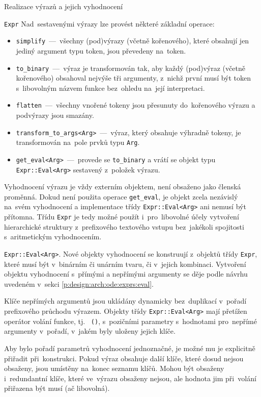\documentclass[thesis=M,czech]{FITthesis}[2012/06/26]
\newcommand{\id}[1]{\texttt{#1}}
\newcommand{\rf}[1]{\ref{#1}}
\begin{document}
\begin{section}{Realizace výrazů a jejich vyhodnocení}
\begin{paragraph}{\id{Expr}}
Nad~sestavenými výrazy lze provést některé základní operace:
\begin{itemize}
\item \id{simplify}~---~všechny (pod)výrazy (včetně kořenového),
   které obsahují jen jediný argument typu token,
   jsou převedeny na~token.
\item \id{to\_\-binary}~---~výraz je transformován tak,
   aby každý (pod)výraz (včetně kořenového)
   obsahoval nejvýše tři argumenty,
   z~nichž první musí být token s~libovolným názvem funkce
   bez~ohledu na~její interpretaci.
\item \id{flatten}~---~všechny vnořené tokeny jsou přesunuty
   do~kořenového výrazu a podvýrazy jsou smazány.
\item \id{transform\_\-to\_\-args<Arg>}~---~výraz,
   který obsahuje výhradně tokeny,
   je transformován na~pole prvků typu \id{Arg}.
\item \id{get\_\-eval<Arg>}~---~provede se \id{to\_\-binary}
   a vrátí se objekt typu \id{Expr::\-Eval<Arg>}
   sestavený z~položek výrazu.
\end{itemize}

Vyhodnocení výrazu je vždy externím objektem,
není obsaženo jako členská proměnná.
Dokud není použita operace \id{get\_\-eval},
je objekt zcela nezávislý na~svém vyhodnocení
a implementace třídy \id{Expr::\-Eval<Arg>} ani nemusí být přítomna.
Třídu \id{Expr} je tedy možné použít
i~pro~libovolné účely vytvoření hierarchické struktury
z~prefixového textového vstupu
bez~jakékoli spojitosti s~aritmetickým vyhodnocením.
\end{paragraph} %


\begin{paragraph}{\id{Expr::\-Eval<Arg>}.}\label{p:impl:exprs:eval}
Nové objekty vyhodnocení se konstruují z~objektů třídy \id{Expr},
které musí být v~binárním či unárním tvaru, či v~jejich kombinaci.
Vytvoření objektu vyhodnocení s~přímými a nepřímými argumenty
se děje podle návrhu uvedeném
v~sekci \rf{p:design:arch:ode:exprs:eval}.

Klíče nepřímých argumentů jsou ukládány dynamicky bez~duplikací
v~pořadí prefixového průchodu výrazem.
Objekty třídy \id{Expr::\-Eval<Arg>} mají přetížen operátor
volání funkce, tj.~ \id{()}, s~pozičními parametry
s~hodnotami pro~nepřímé argumenty v~pořadí,
v~jakém byly uloženy jejich klíče.

Aby bylo pořadí parametrů vyhodnocení jednoznačné,
je možné mu je explicitně přiřadit při~konstrukci.
Pokud výraz obsahuje další klíče,
které dosud nejsou obsaženy,
jsou umístěny na~konec seznamu klíčů.
Mohou být obsaženy i~redundantní klíče,
které ve~výrazu obsaženy nejsou,
ale hodnota jim při~volání přiřazena být musí (ač libovolná).


\end{paragraph}
\end{section}
\end{document}
